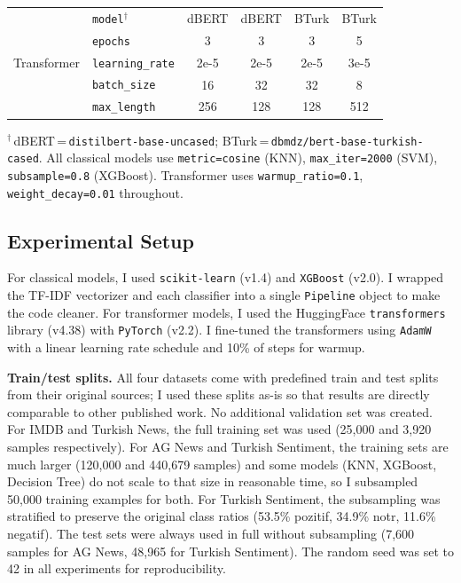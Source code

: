 \documentclass[conference]{IEEEtran}
\begin{document}
\begin{table}[t]
\begin{center}
\begin{tabular}{llcccc}
			\midrule
			\multirow{5}{*}{Transformer}
			                    & \texttt{model}$^\dagger$  & dBERT & dBERT & BTurk & BTurk \\
			                    & \texttt{epochs}           & 3     & 3     & 3     & 5 \\
			                    & \texttt{learning\_rate}   & 2e-5  & 2e-5  & 2e-5  & 3e-5 \\
			                    & \texttt{batch\_size}      & 16    & 32    & 32    & 8 \\
			                    & \texttt{max\_length}      & 256   & 128   & 128   & 512 \\
			\bottomrule
		\end{tabular}
	\end{center}
	\vspace{2pt}
	\footnotesize $^\dagger$\,dBERT\,=\,\texttt{distilbert-base-uncased};\quad
	BTurk\,=\,\texttt{dbmdz/bert-base-turkish-cased}.\quad
	All classical models use \texttt{metric=cosine} (KNN), \texttt{max\_iter=2000} (SVM),
	\texttt{subsample=0.8} (XGBoost). Transformer uses \texttt{warmup\_ratio=0.1},
	\texttt{weight\_decay=0.01} throughout.
\end{table}

\subsection{Experimental Setup}

For classical models, I used \texttt{scikit-learn} (v1.4) and \texttt{XGBoost} (v2.0). I
wrapped the TF-IDF vectorizer and each classifier into a single \texttt{Pipeline} object to
make the code cleaner. For transformer models, I used the HuggingFace \texttt{transformers}
library (v4.38) with \texttt{PyTorch} (v2.2). I fine-tuned the transformers using
\texttt{AdamW} with a linear learning rate schedule and 10\% of steps for warmup.

\textbf{Train/test splits.} All four datasets come with predefined train and test splits
from their original sources; I used these splits as-is so that results are directly
comparable to other published work. No additional validation set was created. For
IMDB and Turkish News, the full training set was used (25,000 and 3,920 samples
respectively). For AG News and Turkish Sentiment, the training sets are much larger
(120,000 and 440,679 samples) and some models (KNN, XGBoost, Decision Tree) do not
scale to that size in reasonable time, so I subsampled 50,000 training examples for
both. For Turkish Sentiment, the subsampling was stratified to preserve the original
class ratios (53.5\% pozitif, 34.9\% notr, 11.6\% negatif). The test sets were always
used in full without subsampling (7,600 samples for AG News, 48,965 for Turkish
Sentiment). The random seed was set to 42 in all experiments for reproducibility.
\end{document}
